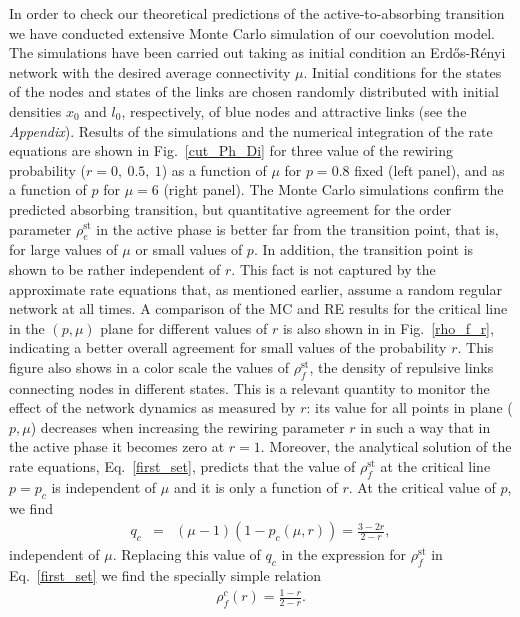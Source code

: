 \documentclass[aps,pre,notitlepage]{revtex4-1}
\begin{document}
In order to check our theoretical predictions of the active-to-absorbing transition we have conducted extensive Monte Carlo simulation of our coevolution model. The simulations have been carried out taking as initial condition an Erd\H{o}s-R\'enyi network with the desired average connectivity $\mu$. Initial conditions for the states of the nodes and states of the links are chosen randomly distributed with initial densities $x_0$ and $l_0$, respectively, of blue nodes and attractive links (see the \emph{Appendix}). Results of the simulations and the numerical integration of the rate equations are shown in Fig.~\ref{cut_Ph_Di} for three value of the rewiring probability ($r=0 ,\ 0.5,\ 1$) as a function of $\mu$ for $p=0.8$ fixed (left panel), and as a function of $p$ for $\mu=6$ (right panel). The Monte Carlo simulations confirm the predicted absorbing transition, but quantitative agreement for the order parameter $\rho_e^\text{st}$ in the active phase is better far from the transition point, that is, for large values of $\mu$ or small values of $p$. In addition, the transition point is shown to be rather independent of $r$. This fact is not captured by the approximate rate equations that, as mentioned earlier, assume a random regular network at all times. A comparison of the MC and RE results for the critical line in the $(p,\mu)$ plane for different values of $r$ is also shown in in Fig.~\ref{rho_f_r}, indicating a better overall agreement for small values of the probability $r$. This figure also shows in a color scale the values of $\rho_{f}^\text{st}$, the density of repulsive links connecting nodes in different states. This is a relevant quantity to monitor the effect of the network dynamics as measured by $r$: its value for all points in plane ($p,\mu$) decreases when increasing the rewiring parameter $r$ in such a way that in the active phase it becomes zero at $r=1$.
Moreover, the analytical solution of the rate equations, Eq.~\eqref{first_set}, predicts that the value of $\rho_{f}^\text{st}$ at the critical line $p=p_c$ is independent of $\mu$ and it is only a function of $r$. At the critical value of $p$, we find
\begin{eqnarray} 
q_c&=&(\mu-1)(1-p_{c}(\mu,r))=\frac{3-2r}{2-r},
\end{eqnarray}
independent of $\mu$. Replacing this value of $q_c$ in the expression for $\rho_{f}^\text{st}$ in Eq.~\eqref{first_set} we find the specially simple relation
\begin{eqnarray}\label{rhofc}
\rho_{f}^{c}(r)=\frac{1-r}{2-r}.
\label{rho_f_c}
\end{eqnarray}
\end{document}
